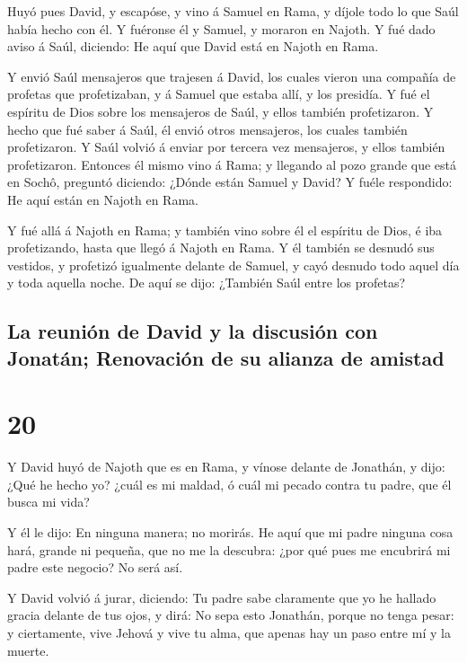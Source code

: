  Huyó pues David, y escapóse, y vino á Samuel en Rama, y
díjole todo lo que Saúl había hecho con él. Y fuéronse él y Samuel, y
moraron en Najoth.  Y fué dado aviso á Saúl, diciendo: He
aquí que David está en Najoth en Rama.

 Y envió Saúl mensajeros que trajesen á David, los cuales
vieron una compañía de profetas que profetizaban, y á Samuel que estaba
allí, y los presidía. Y fué el espíritu de Dios sobre los mensajeros de
Saúl, y ellos también profetizaron.  Y hecho que fué
saber á Saúl, él envió otros mensajeros, los cuales también
profetizaron. Y Saúl volvió á enviar por tercera vez mensajeros, y ellos
también profetizaron.  Entonces él mismo vino á Rama; y
llegando al pozo grande que está en Sochô, preguntó diciendo: ¿Dónde
están Samuel y David? Y fuéle respondido: He aquí están en Najoth en
Rama.

 Y fué allá á Najoth en Rama; y también vino sobre él el
espíritu de Dios, é iba profetizando, hasta que llegó á Najoth en Rama.
 Y él también se desnudó sus vestidos, y profetizó
igualmente delante de Samuel, y cayó desnudo todo aquel día y toda
aquella noche. De aquí se dijo: ¿También Saúl entre los profetas?

\hypertarget{la-reuniuxf3n-de-david-y-la-discusiuxf3n-con-jonatuxe1n-renovaciuxf3n-de-su-alianza-de-amistad}{%
\subsection{La reunión de David y la discusión con Jonatán; Renovación
de su alianza de
amistad}\label{la-reuniuxf3n-de-david-y-la-discusiuxf3n-con-jonatuxe1n-renovaciuxf3n-de-su-alianza-de-amistad}}

\hypertarget{section-19}{%
\section{20}\label{section-19}}

 Y David huyó de Najoth que es en Rama, y vínose delante
de Jonathán, y dijo: ¿Qué he hecho yo? ¿cuál es mi maldad, ó cuál mi
pecado contra tu padre, que él busca mi vida?

 Y él le dijo: En ninguna manera; no morirás. He aquí que
mi padre ninguna cosa hará, grande ni pequeña, que no me la descubra:
¿por qué pues me encubrirá mi padre este negocio? No será así.

 Y David volvió á jurar, diciendo: Tu padre sabe
claramente que yo he hallado gracia delante de tus ojos, y dirá: No sepa
esto Jonathán, porque no tenga pesar: y ciertamente, vive Jehová y vive
tu alma, que apenas hay un paso entre mí y la muerte.

